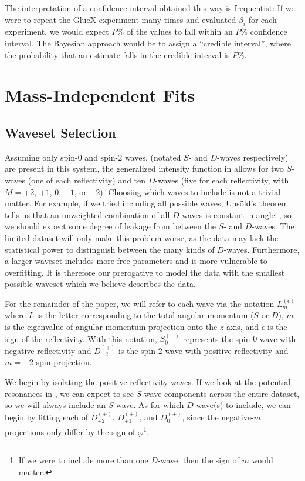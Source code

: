 The interpretation of a confidence interval obtained this way is frequentist: If we were to repeat the GlueX experiment many times and evaluated $\beta_i$ for each experiment, we would expect $P\%$ of the values to fall within an $P\%$ confidence interval. The Bayesian approach would be to assign a ``credible interval'', where the probability that an estimate falls in the credible interval is $P\%$.

\section{Mass-Independent Fits}\label{sec:mass-independent-fits}

\subsection{Waveset Selection}

Assuming only spin-$0$ and spin-$2$ waves, (notated $S$- and $D$-waves respectively) are present in this system, the generalized intensity function in  allows for two $S$-waves (one of each reflectivity) and ten $D$-waves (five for each reflectivity, with $M=+2$, $+1$, $0$, $-1$, or $-2$). Choosing which waves to include is not a trivial matter. For example, if we tried including all possible waves, Uns\"old's theorem tells us that an unweighted combination of all $D$-waves is constant in angle~\cite{Unsld1927}, so we should expect some degree of leakage from between the $S$- and $D$-waves. The limited dataset will only make this problem worse, as the data may lack the statistical power to distinguish between the many kinds of $D$-waves. Furthermore, a larger waveset includes more free parameters and is more vulnerable to overfitting. It is therefore our prerogative to model the data with the smallest possible waveset which we believe describes the data.

For the remainder of the paper, we will refer to each wave via the notation $L_m^{(\epsilon)}$ where $L$ is the letter corresponding to the total angular momentum ($S$ or $D$), $m$ is the eigenvalue of angular momentum projection onto the $z$-axis, and $\epsilon$ is the sign of the reflectivity. With this notation, $S_0^{(-)}$ represents the spin-$0$ wave with negative reflectivity and $D_{-2}^{(+)}$ is the spin-$2$ wave with positive reflectivity and $m=-2$ spin projection.

We begin by isolating the positive reflectivity waves. If we look at the potential resonances in , we can expect to see $S$-wave components across the entire dataset, so we will always include an $S$-wave. As for which $D$-wave(s) to include, we can begin by fitting each of $D_{+2}^{(+)}$, $D_{+1}^{(+)}$, and $D_{0}^{(+)}$, since the negative-$m$ projections only differ by the sign of $\varphi$\footnote{If we were to include more than one $D$-wave, then the sign of $m$ would matter.}.

